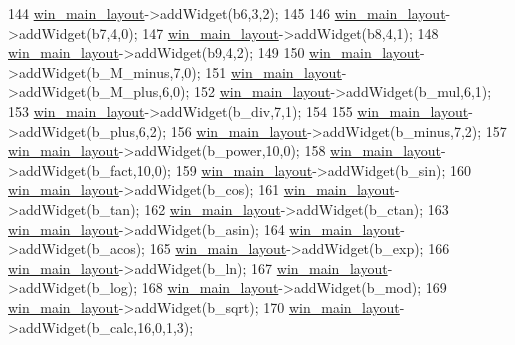 \begin{DoxyCode}
144     \hyperlink{classControl_ab3a44edbe7c336f435e0d0e8d2258e0d}{win\_main\_layout}->addWidget(b6,3,2);
145 
146     \hyperlink{classControl_ab3a44edbe7c336f435e0d0e8d2258e0d}{win\_main\_layout}->addWidget(b7,4,0);
147     \hyperlink{classControl_ab3a44edbe7c336f435e0d0e8d2258e0d}{win\_main\_layout}->addWidget(b8,4,1);
148     \hyperlink{classControl_ab3a44edbe7c336f435e0d0e8d2258e0d}{win\_main\_layout}->addWidget(b9,4,2);
149 
150     \hyperlink{classControl_ab3a44edbe7c336f435e0d0e8d2258e0d}{win\_main\_layout}->addWidget(b\_M\_minus,7,0);
151     \hyperlink{classControl_ab3a44edbe7c336f435e0d0e8d2258e0d}{win\_main\_layout}->addWidget(b\_M\_plus,6,0);
152     \hyperlink{classControl_ab3a44edbe7c336f435e0d0e8d2258e0d}{win\_main\_layout}->addWidget(b\_mul,6,1);
153     \hyperlink{classControl_ab3a44edbe7c336f435e0d0e8d2258e0d}{win\_main\_layout}->addWidget(b\_div,7,1);
154 
155     \hyperlink{classControl_ab3a44edbe7c336f435e0d0e8d2258e0d}{win\_main\_layout}->addWidget(b\_plus,6,2);
156     \hyperlink{classControl_ab3a44edbe7c336f435e0d0e8d2258e0d}{win\_main\_layout}->addWidget(b\_minus,7,2);
157     \hyperlink{classControl_ab3a44edbe7c336f435e0d0e8d2258e0d}{win\_main\_layout}->addWidget(b\_power,10,0);
158     \hyperlink{classControl_ab3a44edbe7c336f435e0d0e8d2258e0d}{win\_main\_layout}->addWidget(b\_fact,10,0);
159     \hyperlink{classControl_ab3a44edbe7c336f435e0d0e8d2258e0d}{win\_main\_layout}->addWidget(b\_sin);
160     \hyperlink{classControl_ab3a44edbe7c336f435e0d0e8d2258e0d}{win\_main\_layout}->addWidget(b\_cos);
161     \hyperlink{classControl_ab3a44edbe7c336f435e0d0e8d2258e0d}{win\_main\_layout}->addWidget(b\_tan);
162     \hyperlink{classControl_ab3a44edbe7c336f435e0d0e8d2258e0d}{win\_main\_layout}->addWidget(b\_ctan);
163     \hyperlink{classControl_ab3a44edbe7c336f435e0d0e8d2258e0d}{win\_main\_layout}->addWidget(b\_asin);
164     \hyperlink{classControl_ab3a44edbe7c336f435e0d0e8d2258e0d}{win\_main\_layout}->addWidget(b\_acos);
165     \hyperlink{classControl_ab3a44edbe7c336f435e0d0e8d2258e0d}{win\_main\_layout}->addWidget(b\_exp);
166     \hyperlink{classControl_ab3a44edbe7c336f435e0d0e8d2258e0d}{win\_main\_layout}->addWidget(b\_ln);
167     \hyperlink{classControl_ab3a44edbe7c336f435e0d0e8d2258e0d}{win\_main\_layout}->addWidget(b\_log);
168     \hyperlink{classControl_ab3a44edbe7c336f435e0d0e8d2258e0d}{win\_main\_layout}->addWidget(b\_mod);
169     \hyperlink{classControl_ab3a44edbe7c336f435e0d0e8d2258e0d}{win\_main\_layout}->addWidget(b\_sqrt);
170     \hyperlink{classControl_ab3a44edbe7c336f435e0d0e8d2258e0d}{win\_main\_layout}->addWidget(b\_calc,16,0,1,3);

\end{DoxyCode}
